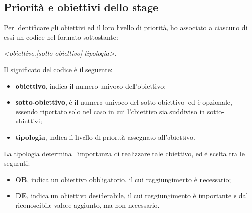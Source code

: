 \subsection{Priorità e obiettivi dello stage}
Per identificare gli obiettivi ed il loro livello di priorità, ho associato a ciascuno di essi un codice nel formato sottostante:
\\
\begin{center}
	\textit{<obiettivo.[sotto-obiettivo]-tipologia>. }
\end{center}
Il significato del codice è il seguente:
\begin{itemize}
\item \textbf{obiettivo}, indica il numero univoco dell'obiettivo;
\item \textbf{sotto-obiettivo}, è il numero univoco del sotto-obiettivo, ed è opzionale, essendo riportato solo nel caso in cui l'obiettivo sia suddiviso in sotto-obiettivi;
\item \textbf{tipologia}, indica il livello di priorità assegnato all'obiettivo.
\end{itemize}
La tipologia determina l'importanza di realizzare tale obiettivo, ed è scelta tra le seguenti:
\begin{itemize}
	\item \textbf{OB}, indica un obiettivo obbligatorio, il cui raggiungimento è necessario;
	\item \textbf{DE}, indica un obiettivo desiderabile, il cui raggiungimento è importante e dal riconoscibile valore aggiunto, ma non necessario.
\end{itemize}

